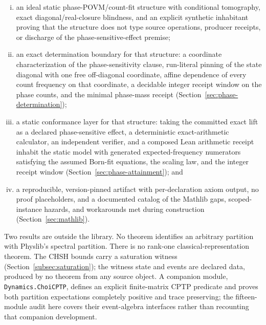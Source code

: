 \documentclass[11pt]{article}
\renewcommand{\_}{\textunderscore\allowbreak}
\theoremstyle{remark}
\begin{document}
\begin{enumerate}[(i)]
state and four declared projection events inhabiting a bipartite
slot-locality interface of the wider library, whose CHSH expectation equals
$2\sqrt2$ exactly, packaged with the cited upper bounds, together with a
record-diagonal delimitation proving the classical bound $2$ for every
diagonal state read against four diagonal observables valued in $[-1,1]$;
\item an ideal static phase-POVM/count-fit structure with conditional
tomography, exact diagonal/real-closure blindness, and an explicit synthetic
inhabitant proving that the structure does not type source operations,
producer receipts, or discharge of the phase-sensitive-effect premise;
\item an exact determination boundary for that structure: a coordinate
characterization of the phase-sensitivity clause, run-literal pinning of the
state diagonal with one free off-diagonal coordinate, affine dependence of
every count frequency on that coordinate, a decidable integer receipt window
on the phase counts, and the minimal phase-mass receipt
(Section~\ref{sec:phase-determination});
\item a static conformance layer for that structure: taking the committed exact
lift as a declared phase-sensitive effect, a
deterministic exact-arithmetic calculator, an independent verifier, and a
composed Lean arithmetic receipt inhabit the static model with generated
expected-frequency numerators satisfying the assumed Born-fit equations,
the scaling law, and the integer receipt window
(Section~\ref{sec:phase-attainment}); and
\item a reproducible, version-pinned artifact with per-declaration axiom
output, no proof placeholders, and a documented catalog of the Mathlib gaps,
scoped-instance hazards, and workarounds met during construction
(Section~\ref{sec:mathlib}).
\end{enumerate}

Two results are outside the library. No theorem identifies an
arbitrary partition with Physlib's spectral partition. There is no rank-one
classical-representation theorem. The CHSH bounds carry a saturation witness
(Section~\ref{subsec:saturation}); the witness state and events are declared
data, produced by no theorem from any source object. A companion module,
\texttt{Dynamics.ChoiCPTP}, defines an explicit finite-matrix CPTP
predicate and proves both partition expectations completely positive and
trace preserving; the fifteen-module audit here covers their event-algebra
interfaces rather than recounting that companion development.
\end{document}
